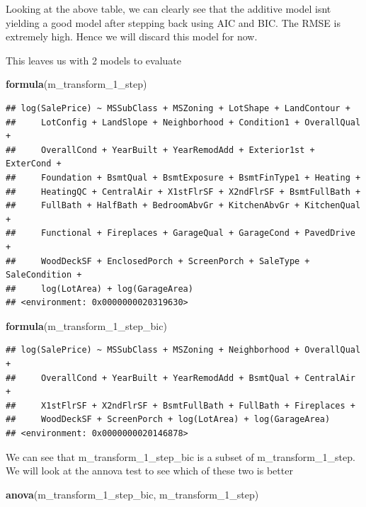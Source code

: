 \documentclass[
]{article}
\newenvironment{Shaded}{\begin{snugshade}}{\end{snugshade}}
\newcommand{\DecValTok}[1]{\textcolor[rgb]{0.00,0.00,0.81}{#1}}
\newcommand{\KeywordTok}[1]{\textcolor[rgb]{0.13,0.29,0.53}{\textbf{#1}}}
\newcommand{\NormalTok}[1]{#1}
\begin{document}
Looking at the above table, we can clearly see that the additive model isnt yielding a good model after stepping back using AIC and BIC. The RMSE is extremely high. Hence we will discard this model for now.

This leaves us with 2 models to evaluate

\begin{Shaded}
\begin{Highlighting}[]
\KeywordTok{formula}\NormalTok{(m_transform_}\DecValTok{1}\NormalTok{_step)}
\end{Highlighting}
\end{Shaded}

\begin{verbatim}
## log(SalePrice) ~ MSSubClass + MSZoning + LotShape + LandContour + 
##     LotConfig + LandSlope + Neighborhood + Condition1 + OverallQual + 
##     OverallCond + YearBuilt + YearRemodAdd + Exterior1st + ExterCond + 
##     Foundation + BsmtQual + BsmtExposure + BsmtFinType1 + Heating + 
##     HeatingQC + CentralAir + X1stFlrSF + X2ndFlrSF + BsmtFullBath + 
##     FullBath + HalfBath + BedroomAbvGr + KitchenAbvGr + KitchenQual + 
##     Functional + Fireplaces + GarageQual + GarageCond + PavedDrive + 
##     WoodDeckSF + EnclosedPorch + ScreenPorch + SaleType + SaleCondition + 
##     log(LotArea) + log(GarageArea)
## <environment: 0x0000000020319630>
\end{verbatim}

\begin{Shaded}
\begin{Highlighting}[]
\KeywordTok{formula}\NormalTok{(m_transform_}\DecValTok{1}\NormalTok{_step_bic)}
\end{Highlighting}
\end{Shaded}

\begin{verbatim}
## log(SalePrice) ~ MSSubClass + MSZoning + Neighborhood + OverallQual + 
##     OverallCond + YearBuilt + YearRemodAdd + BsmtQual + CentralAir + 
##     X1stFlrSF + X2ndFlrSF + BsmtFullBath + FullBath + Fireplaces + 
##     WoodDeckSF + ScreenPorch + log(LotArea) + log(GarageArea)
## <environment: 0x0000000020146878>
\end{verbatim}

We can see that m\_transform\_1\_step\_bic is a subset of m\_transform\_1\_step. We will look at the annova test to see which of these two is better

\begin{Shaded}
\begin{Highlighting}[]
\KeywordTok{anova}\NormalTok{(m_transform_}\DecValTok{1}\NormalTok{_step_bic, m_transform_}\DecValTok{1}\NormalTok{_step)}
\end{Highlighting}
\end{Shaded}
\end{document}
